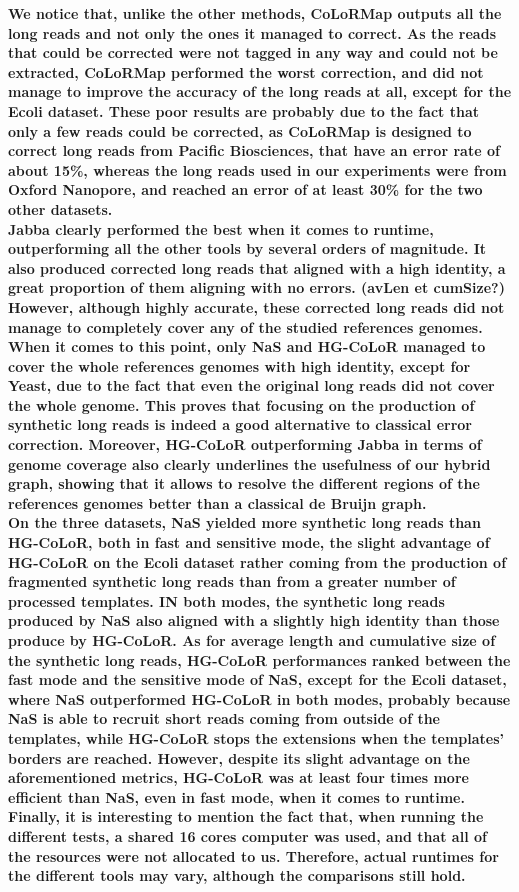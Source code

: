 \documentclass[long, final]{jobim2017}
\begin{document}
\textbf{We notice that, unlike the other methods, CoLoRMap outputs all the long reads and not only the ones it managed to correct. As the reads that could be corrected were not tagged in any way and could not be extracted, CoLoRMap performed the worst correction, and did not manage to improve the accuracy of the long reads at all, except for the Ecoli dataset. These poor results are probably due to the fact that only a few reads could be corrected, as CoLoRMap is designed to correct long reads from Pacific Biosciences, that have an error rate of about 15\%, whereas the long reads used in our experiments were from Oxford Nanopore, and reached an error of at least 30\% for the two other datasets. \\
\indent Jabba clearly performed the best when it comes to runtime, outperforming all the other tools by several orders of magnitude. It also produced corrected long reads that aligned with a high identity, a great proportion of them aligning with no errors. (avLen et cumSize?) However, although highly accurate, these corrected long reads did not manage to completely cover any of the studied references genomes. \\
\indent When it comes to this point, only NaS and HG-CoLoR managed to cover the whole references genomes with high identity, except for Yeast, due to the fact that even the original long reads did not cover the whole genome. This proves that focusing on the production of synthetic long reads is indeed a good alternative to classical error correction. Moreover, HG-CoLoR outperforming Jabba in terms of genome coverage also clearly underlines the usefulness of our hybrid graph, showing that it allows to resolve the different regions of the references genomes better than a classical de Bruijn graph. \\
\indent On the three datasets, NaS yielded more synthetic long reads than HG-CoLoR, both in fast and sensitive mode, the slight advantage of HG-CoLoR on the Ecoli dataset rather coming from the production of fragmented synthetic long reads than from a greater number of processed templates. IN both modes, the synthetic long reads produced by NaS also aligned with a slightly high identity than those produce by HG-CoLoR. As for average length and cumulative size of the synthetic long reads, HG-CoLoR performances ranked between the fast mode and the sensitive mode of NaS, except for the Ecoli dataset, where NaS outperformed HG-CoLoR in both modes, probably because NaS is able to recruit short reads coming from outside of the templates, while HG-CoLoR stops the extensions when the templates' borders are reached. However, despite its slight advantage on the aforementioned metrics, HG-CoLoR was at least four times more efficient than NaS, even in fast mode, when it comes to runtime. \\
\indent Finally, it is interesting to mention the fact that, when running the different tests, a shared 16 cores computer was used, and that all of the resources were not allocated to us. Therefore, actual runtimes for the different tools may vary, although the comparisons still hold.}
\end{document}
